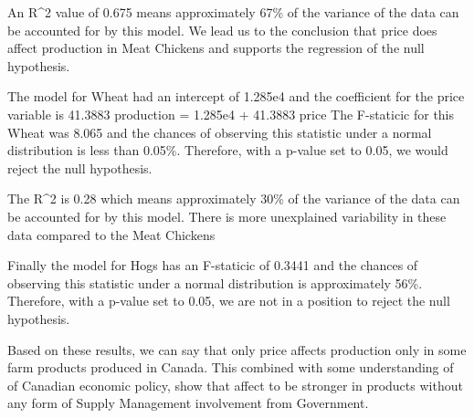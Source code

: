 An R^2 value of  0.675  means approximately 67\% of the variance of the data can be accounted for by this model. We lead us to the conclusion that price does affect production in Meat Chickens and supports the regression of the null hypothesis. 

The model for Wheat had an intercept of 1.285e4 and the coefficient for the price variable is 41.3883
\newline
production  =  1.285e4 + 41.3883 \times price
\newline
The F-staticic for this Wheat was 8.065 and the chances of observing this statistic under a normal distribution is less than 0.05\%. Therefore, with a p-value set to 0.05, we would reject the null hypothesis. 

The R^2 is 0.28 which means approximately 30\% of the variance of the data can be accounted for by this model. There is more unexplained variability in these data compared to the Meat Chickens

Finally the model for Hogs has an F-staticic of 0.3441 and the chances of observing this statistic under a normal distribution is approximately 56\%. Therefore, with a p-value set to 0.05, we are not in a position to reject the null hypothesis. 

Based on these results, we can say that only price affects production only in some farm products produced in Canada. This combined with some understanding of of Canadian economic policy, show that affect to be stronger in products without any form of Supply Management involvement from Government. 
